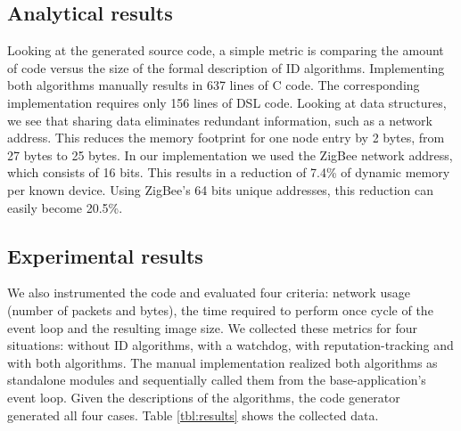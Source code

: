 \documentclass[3p,times,procedia]{elsarticle}
\begin{document}
\subsection{Analytical results}

Looking at the generated source code, a simple metric is comparing the amount
of code versus the size of the formal description of ID algorithms.
Implementing both algorithms manually results in 637 lines of C code. The
corresponding \FOO implementation requires only 156 lines of DSL code. Looking
at data structures, we see that sharing data eliminates redundant information,
such as a network address. This reduces the memory footprint for one node entry
by 2 bytes, from 27 bytes to 25 bytes. In our implementation we used the ZigBee
network address, which consists of 16 bits. This results in a reduction of
7.4\% of dynamic memory per known device. Using ZigBee's 64 bits unique
addresses, this reduction can easily become 20.5\%.

\subsection{Experimental results}

We also instrumented the code and evaluated four criteria: network usage
(number of packets and bytes), the time required to perform once cycle of the
event loop and the resulting image size. We collected these metrics for four
situations: without ID algorithms, with a watchdog, with reputation-tracking
and with both algorithms. The manual implementation realized both algorithms as
standalone modules and sequentially called them from the base-application's
event loop. Given the \FOO descriptions of the algorithms, the code generator
generated all four cases. Table \ref{tbl:results} shows the collected data.
\end{document}
